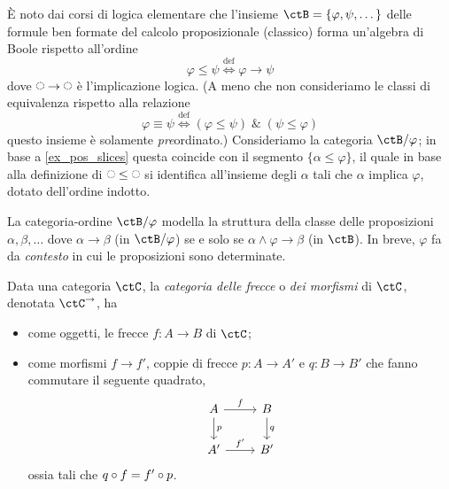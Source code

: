 \begin{example}\label{ex_boole_cpc}
	\`E noto dai corsi di logica elementare che l'insieme \(\ctB=\{\varphi,\psi,\dots\}\) delle formule ben formate del calcolo proposizionale (classico) forma un'algebra di Boole rispetto all'ordine
	\[\varphi\le\psi \overset{\text{def}}\iff \varphi \to \psi\]
	dove \(\blank\to\blank\) è l'implicazione logica. (A meno che non consideriamo le classi di equivalenza rispetto alla relazione
	\[\varphi\equiv\psi \overset{\text{def}}\iff (\varphi\le \psi) \; \& \; (\psi\le\varphi)\]
	questo insieme è solamente \emph{pre}ordinato.) Consideriamo la categoria \(\ctB/\varphi\); in base a \ref{ex_pos_slices} questa coincide con il segmento \(\{\alpha\le\varphi\}\), il quale in base alla definizione di \(\blank\le\blank\) si identifica all'insieme degli \(\alpha\) tali che \(\alpha\) implica \(\varphi\), dotato dell'ordine indotto.

	La categoria-ordine \(\ctB/\varphi\) modella la struttura della classe delle proposizioni \(\alpha,\beta,\dots\) dove \(\alpha \to \beta\) (in \(\ctB/\varphi\)) se e solo se \(\alpha \land \varphi \to \beta\) (in \(\ctB\)). In breve, \(\varphi\) fa da \emph{contesto} in cui le proposizioni sono determinate.
\end{example}
\begin{definition}\label{def_cat_frecce}
	Data una categoria \(\ctC\), la \emph{categoria delle frecce} o \emph{dei morfismi} di \(\ctC\), denotata \(\ctC^\to\), ha
	\begin{itemize}
		\item come oggetti, le frecce \(f:A\to B\) di \(\ctC\);
		\item come morfismi \(f\to f'\), coppie di frecce \(p:A\to A'\) e \(q:B\to B'\) che fanno commutare il seguente quadrato,
		      \[
			      \begin{tikzcd}
				      A \ar{r}{f} \ar{d}{p} & B \ar{d}{q} \\
				      A' \ar{r}{f'} & B'
			      \end{tikzcd}
		      \]
		      ossia tali che \(q\circ f=f'\circ p\).
	\end{itemize}
\end{definition}

